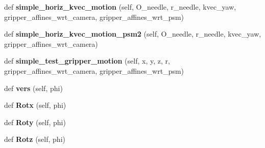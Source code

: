 \begin{DoxyCompactItemize}
\item 
def {\bfseries simple\+\_\+horiz\+\_\+kvec\+\_\+motion} (self, O\+\_\+needle, r\+\_\+needle, kvec\+\_\+yaw, gripper\+\_\+affines\+\_\+wrt\+\_\+camera, gripper\+\_\+affines\+\_\+wrt\+\_\+psm)\hypertarget{classneedle__planner__gripper__working_1_1needle__planner_a75643801eba898ed24bfbb438b55f0b0}{}\label{classneedle__planner__gripper__working_1_1needle__planner_a75643801eba898ed24bfbb438b55f0b0}

\item 
def {\bfseries simple\+\_\+horiz\+\_\+kvec\+\_\+motion\+\_\+psm2} (self, O\+\_\+needle, r\+\_\+needle, kvec\+\_\+yaw, gripper\+\_\+affines\+\_\+wrt\+\_\+camera)\hypertarget{classneedle__planner__gripper__working_1_1needle__planner_ad7f1962a4b0c44e0af1c36e18b70ea5a}{}\label{classneedle__planner__gripper__working_1_1needle__planner_ad7f1962a4b0c44e0af1c36e18b70ea5a}

\item 
def {\bfseries simple\+\_\+test\+\_\+gripper\+\_\+motion} (self, x, y, z, r, gripper\+\_\+affines\+\_\+wrt\+\_\+camera, gripper\+\_\+affines\+\_\+wrt\+\_\+psm)\hypertarget{classneedle__planner__gripper__working_1_1needle__planner_abc6fee050f1bd6ee0954c7e2a67ae801}{}\label{classneedle__planner__gripper__working_1_1needle__planner_abc6fee050f1bd6ee0954c7e2a67ae801}

\item 
def {\bfseries vers} (self, phi)\hypertarget{classneedle__planner__gripper__working_1_1needle__planner_a68f363e53fc3a37fd8fce0e70c964f67}{}\label{classneedle__planner__gripper__working_1_1needle__planner_a68f363e53fc3a37fd8fce0e70c964f67}

\item 
def {\bfseries Rotx} (self, phi)\hypertarget{classneedle__planner__gripper__working_1_1needle__planner_ab5b02f067f2538246f431a636088c9bc}{}\label{classneedle__planner__gripper__working_1_1needle__planner_ab5b02f067f2538246f431a636088c9bc}

\item 
def {\bfseries Roty} (self, phi)\hypertarget{classneedle__planner__gripper__working_1_1needle__planner_aba72ec3eb94c320325eb9b7c6ad32d5a}{}\label{classneedle__planner__gripper__working_1_1needle__planner_aba72ec3eb94c320325eb9b7c6ad32d5a}

\item 
def {\bfseries Rotz} (self, phi)\hypertarget{classneedle__planner__gripper__working_1_1needle__planner_abc4f80d0eff9da81a96b83ff0f2b72fd}{}\label{classneedle__planner__gripper__working_1_1needle__planner_abc4f80d0eff9da81a96b83ff0f2b72fd}


\end{DoxyCompactItemize}
